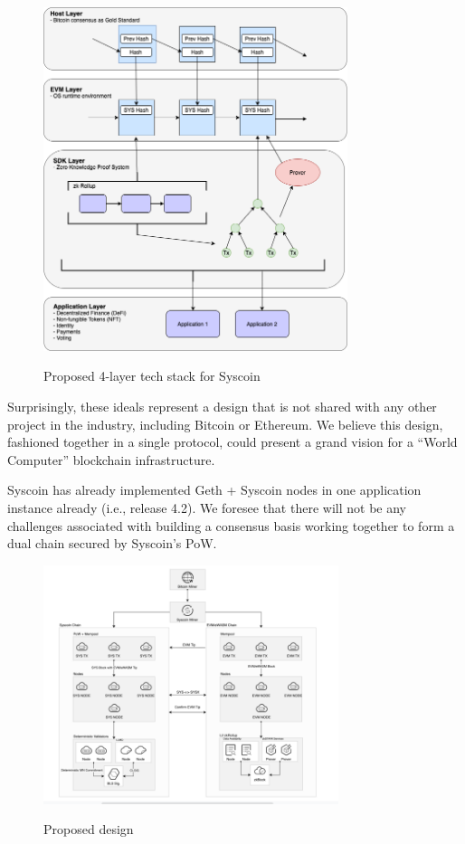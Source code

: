 \documentclass[peerreview]{ieeesyscoin}
\begin{document}
\begin{figure}[h!]
\includegraphics[width=3.5in]{img/4_layer.png}
\label{fig:tech_stack}
\caption{Proposed 4-layer tech stack for Syscoin} 
\end{figure} 

Surprisingly, these ideals represent a design that is not shared with any other project in the industry, including Bitcoin or Ethereum. We believe this design, fashioned together in a single protocol, could present a grand vision for a “World Computer” blockchain infrastructure.

Syscoin has already implemented Geth + Syscoin nodes in one application instance already (i.e., release 4.2). We foresee that there will not be any challenges associated with building a consensus basis working together to form a dual chain secured by Syscoin’s PoW.

\begin{figure}[h!]
\includegraphics[width=3.4in]{img/fig_5.png}
\label{fig:proposed_design}
\caption{Proposed design} 
\end{figure} 
\end{document}
